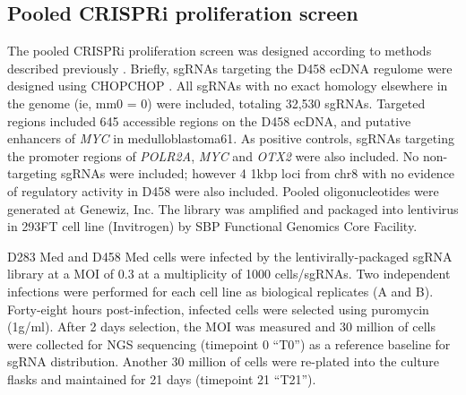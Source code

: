 \subsection{Pooled CRISPRi proliferation screen}
The pooled CRISPRi proliferation screen was designed according to methods described previously \cite{Morton_2019}. Briefly, sgRNAs targeting the D458 ecDNA regulome were designed using CHOPCHOP \cite{chopchop}. All sgRNAs with no exact homology elsewhere in the genome (ie, mm0 = 0) were included, totaling 32,530 sgRNAs. Targeted regions included 645 accessible regions on the D458 ecDNA, and putative enhancers of \textit{MYC} in medulloblastoma61. As positive controls, sgRNAs targeting the promoter regions of \textit{POLR2A}, \textit{MYC} and \textit{OTX2} were also included. No non-targeting sgRNAs were included; however 4 1kbp loci from chr8 with no evidence of regulatory activity in D458 were also included. Pooled oligonucleotides were generated at Genewiz, Inc. The library was amplified and packaged into lentivirus in 293FT cell line (Invitrogen) by SBP Functional Genomics Core Facility.

D283 Med and D458 Med cells were infected by the lentivirally-packaged sgRNA library at a MOI of 0.3 at a multiplicity of 1000 cells/sgRNAs. Two independent infections were performed for each cell line as biological replicates (A and B). Forty-eight hours post-infection, infected cells were selected using puromycin (1\textmugreek g/ml). After 2 days selection, the MOI was measured and 30 million of cells were collected for NGS sequencing (timepoint 0 ``T0'') as a reference baseline for sgRNA distribution. Another 30 million of cells were re-plated into the culture flasks and maintained for 21 days (timepoint 21 ``T21''). 

